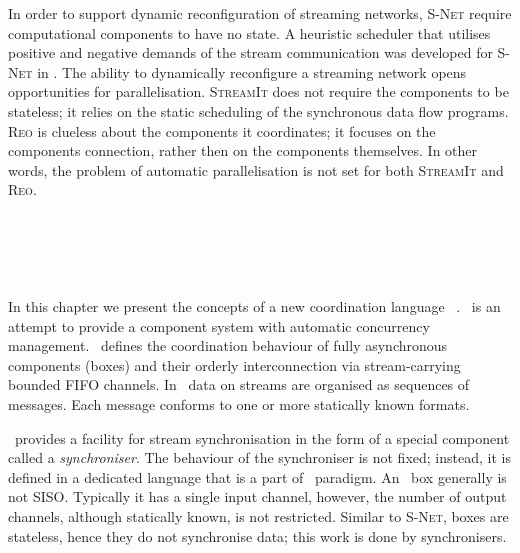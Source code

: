 In order to support dynamic reconfiguration of streaming networks, \textsc{S-Net} require computational components to have no state. A heuristic scheduler that utilises positive and negative demands of the stream communication was developed for \textsc{S-Net} in \cite{nga}. The ability to dynamically reconfigure a streaming network opens opportunities for parallelisation. \textsc{StreamIt} does not require the components to be stateless; it relies on the static scheduling of the synchronous data flow programs. \textsc{Reo} is clueless about the components it coordinates; it focuses on the components connection, rather then on the components themselves. In other words, the problem of automatic parallelisation is not set for both \textsc{StreamIt} and \textsc{Reo}.
%
%



\chapter{\ak\ }
In this chapter we present the concepts of a new coordination language \ak\ . \ak\ is an attempt to provide a component system with automatic concurrency management. \ak\ defines the coordination behaviour of fully asynchronous components (boxes) and their orderly interconnection via stream-carrying bounded FIFO channels. In \ak\, data on streams are organised as sequences of messages. Each message conforms to one or more statically known formats.

\ak\ provides a facility for stream synchronisation in the form of a special component called a \emph{synchroniser}. The behaviour of the synchroniser is not fixed; instead, it is defined in a dedicated language that is a part of \ak\ paradigm. An \ak\ box generally is not SISO. Typically it has a single input channel, however, the number of output channels, although statically known, is not restricted. Similar to \textsc{S-Net}, boxes are stateless, hence they do not synchronise data; this work is done by synchronisers.

